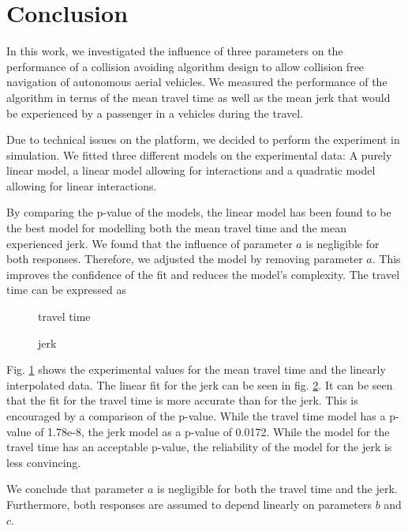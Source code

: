 \section{Conclusion}

In this work, we investigated the influence of three parameters on the performance of a collision avoiding algorithm design to allow collision free navigation of autonomous aerial vehicles. We measured the performance of the algorithm in terms of the mean travel time as well as the mean jerk that would be experienced by a passenger in a vehicles during the travel.

Due to technical issues on the platform, we decided to perform the experiment in simulation.
We fitted three different models on the experimental data: A purely linear model, a linear model allowing for interactions and a quadratic model allowing for linear interactions.

By comparing the p-value of the models, the linear model has been found to be the best model for modelling both the mean travel time and the mean experienced jerk. We found that the influence of parameter $a$ is negligible for both responses. Therefore, we adjusted the model by removing parameter $a$. This improves the confidence of the fit and reduces the model's complexity. The travel time can be expressed as 

\begin{figure}[h]
	\centering
		\setlength{\figH}{0.23\textwidth}
		
		\caption{travel time}\label{fig:concl_time}
\end{figure}	
\begin{figure}
    		\centering
		\setlength{\figH}{0.23\textwidth}		
		
		\caption{jerk}\label{fig:concl_jerk}
\end{figure}

Fig. \ref{fig:concl_time} shows the experimental values for the mean travel time and the linearly interpolated data. The linear fit for the jerk can be seen in fig. \ref{fig:concl_jerk}. It can be seen that the fit for the travel time is more accurate than for the jerk. This is encouraged by a comparison of the p-value. While the travel time model has a p-value of 1.78e-8, the jerk model as a p-value of 0.0172. While the model for the travel time has an acceptable p-value, the reliability of the model for the jerk is less convincing.

We conclude that parameter $a$ is negligible for both the travel time and the jerk. Furthermore, both responses are assumed to depend linearly on parameters $b$ and $c$.